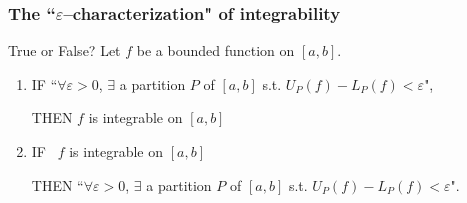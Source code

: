 \documentclass[14pt]{beamer}
\newcommand {\DS} [1] {${\displaystyle #1}$}
\newcommand{\e}{\varepsilon}
\newcommand{\setsize}[1]{\fontsize{#1}{#1}\selectfont} %
\newcommand{\lifab}{\underline{I_a^b}(f)}
\newcommand{\uifab}{\overline{I_a^b}(f)}
\newcommand{\puntos}[2]{
	\draw[thick] (-5,0) to (5,0);
		
	\draw[decorate, decoration={brace, amplitude=10pt}, yshift=10pt] (#1-3.5,-0) -- (#1-0,-0) 
		node [red,midway,yshift=20pt]{lower sums};
	
	\draw[red, fill] (#1-2.5,0) circle [radius=0.1] ;
	\draw[red, fill] (#1-3.3,0) circle [radius=0.1] ;
	\draw[red, fill] (#1-2.0,0) circle [radius=0.1] ;
	\draw[red, fill] (#1-1.8,0) circle [radius=0.1] ;
	\draw[red, fill] (#1-1.3,0) circle [radius=0.1] ;
	\draw[red, fill] (#1-0.8,0) circle [radius=0.1] ;
	\draw[red, fill] (#1-0.5,0) circle [radius=0.1] ;
	\draw[red, fill] (#1-0.2,0) circle [radius=0.1] ;
	\draw[red, fill] (#1-0.05,0) circle [radius=0.1] ;

	\draw[decorate, decoration={brace, amplitude=10pt}, yshift=10pt] (#2+0,0) -- (#2+3.5,0) 
		node [verde,midway,yshift=20pt]{upper sums};
		
	\draw[verde, fill] (#2+2.7,0) circle [radius=0.1] ;
	\draw[verde, fill] (#2+3.1,0) circle [radius=0.1] ;
	\draw[verde, fill] (#2+1.8,0) circle [radius=0.1] ;
	\draw[verde, fill] (#2+1.5,0) circle [radius=0.1] ;
	\draw[verde, fill] (#2+1.2,0) circle [radius=0.1] ;
	\draw[verde, fill] (#2+0.7,0) circle [radius=0.1] ;
	\draw[verde, fill] (#2+0.4,0) circle [radius=0.1] ;
	\draw[verde, fill] (#2+0.2,0) circle [radius=0.1] ;
	\draw[verde, fill] (#2+0.03,0) circle [radius=0.1] ;
}
\newcommand{\puntosmas}[2]{
	\puntos{#1}{#2}
	\draw[very thick, ->] (#1-3.5,-1)--(#1-0,-1) node[black,midway,yshift=-20pt]{finer partitions};
	\draw[very thick, ->] (#2+3.5,-1)--(#2+0,-1) node[black,midway,yshift=-20pt]{finer partitions};
}
\begin{document}
\begin{frame}[t]
\setsize{11}
\frametitle{The ``$\e$--characterization" of integrability}

\begin{block}{\setsize{11} True or False?}
	Let $f$ be a bounded function on $[a,b]$.
		\begin{enumerate}
			\item  IF \hfill ``$\forall \varepsilon>0$, $\exists$ a partition $P$ of $[a,b]$ s.t. \DS{U_P(f) - L_P(f) < \varepsilon}", 
				\vspace{.1cm}

				THEN \; $f$ is integrable on $[a,b]$	
				\vspace{.1cm}
			\item  IF \quad \quad \, $f$ is integrable on $[a,b]$  \vspace{.1cm}\\
				\vspace{.1cm}

				THEN \hfill ``$\forall \varepsilon>0$, $\exists$ a partition $P$ of $[a,b]$ s.t. \DS{U_P(f) - L_P(f) < \varepsilon}".
				\vspace{.1cm}
		\end{enumerate}

\end{block}

\vfill

\begin{center}
\end{center}

\end{frame}
\end{document}
